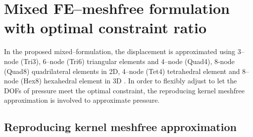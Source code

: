 \section{Mixed FE--meshfree formulation with optimal constraint ratio}

In the proposed mixed--formulation, the displacement is approximated using 3--node (Tri3), 6--node (Tri6) triangular elements and 4--node (Quad4), 8-node (Quad8) quadrilateral elements in 2D, 4--node (Tet4) tetrahedral element and 8--node (Hex8) hexahedral element in 3D \cite{hughes2000}. In order to flexibly adjust to let the DOFs of pressure meet the optimal constraint, the reproducing kernel \DIFaddbegin {}\DIFaddend meshfree approximation is involved to approximate pressure\DIFaddbegin {}\DIFaddend .

\subsection{Reproducing kernel meshfree approximation}\DIFaddbegin \label{subsec:rk_approximation}
\DIFaddend 

